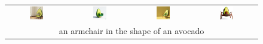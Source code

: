 \begin{figure}[ht!]
\begin{tabular}{cccc}
        \includegraphics[width=0.24\textwidth]{figures/cross/avocado_0.jpg} &
        \includegraphics[width=0.24\textwidth]{figures/cross/avocado_1.jpg} &
        \includegraphics[width=0.24\textwidth]{figures/cross/avocado_2.jpg} &
        \includegraphics[width=0.24\textwidth]{figures/cross/avocado_3.jpg} \vspace{-1mm}\\
        \multicolumn{4}{c}{\small an armchair in the shape of an avocado}\\
        

\end{tabular}
\end{figure}
